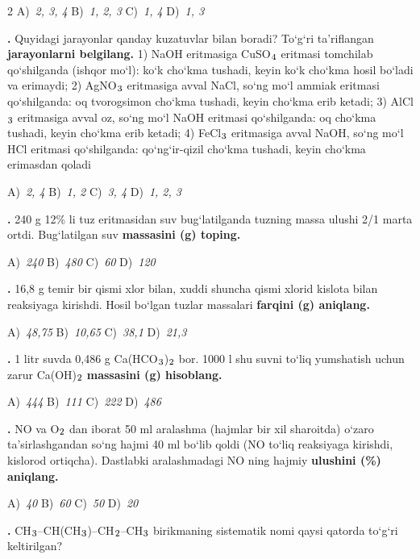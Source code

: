 \documentclass[11pt,a4paper]{article}
\renewcommand{\textsubscript}[1]{\ensuremath{_{\text{\fontsize{8}{8}\selectfont #1}}}}
\newcommand{\qn}[1]{\textbf{\fontsize{11.5}{13}\selectfont #1}}
\newcommand{\qsep}{\par\vspace{13pt}}
\begin{document}
\begin{multicols}{2}
\noindent A)~\textsl{2, 3, 4} \hfill B)~\textsl{1, 2, 3} \hfill C)~\textsl{1, 4} \hfill D)~\textsl{1, 3}\par
\qsep
\noindent\qn{15.} Quyidagi jarayonlar qanday kuzatuvlar bilan boradi? To`g`ri ta'riflangan \textbf{jarayonlarni belgilang.} 1) NaOH eritmasiga CuSO\textsubscript{4} eritmasi tomchilab qo`shilganda (ishqor mo`l): ko`k cho`kma tushadi, keyin ko`k cho`kma hosil bo`ladi va erimaydi; 2) AgNO\textsubscript{3} eritmasiga avval NaCl, so`ng mo`l ammiak eritmasi qo`shilganda: oq tvorogsimon cho`kma tushadi, keyin cho`kma erib ketadi; 3) AlCl\textsubscript{3} eritmasiga avval oz, so`ng mo`l NaOH eritmasi qo`shilganda: oq cho`kma tushadi, keyin cho`kma erib ketadi; 4) FeCl\textsubscript{3} eritmasiga avval NaOH, so`ng mo`l HCl eritmasi qo`shilganda: qo`ng`ir-qizil cho`kma tushadi, keyin cho`kma erimasdan qoladi

\noindent A)~\textsl{2, 4} \hfill B)~\textsl{1, 2} \hfill C)~\textsl{3, 4} \hfill D)~\textsl{1, 2, 3}\par
\qsep
\noindent\qn{16.} 240 g 12\% li tuz eritmasidan suv bug`latilganda tuzning massa ulushi 2/1 marta ortdi. Bug`latilgan suv \textbf{massasini (g) toping.}

\noindent A)~\textsl{240} \hfill B)~\textsl{480} \hfill C)~\textsl{60} \hfill D)~\textsl{120}\par
\qsep
\noindent\qn{17.} 16,8 g temir bir qismi xlor bilan, xuddi shuncha qismi xlorid kislota bilan reaksiyaga kirishdi. Hosil bo`lgan tuzlar massalari \textbf{farqini (g) aniqlang.}

\noindent A)~\textsl{48,75} \hfill B)~\textsl{10,65} \hfill C)~\textsl{38,1} \hfill D)~\textsl{21,3}\par
\qsep
\noindent\qn{18.} 1 litr suvda 0,486 g Ca(HCO\textsubscript{3})\textsubscript{2} bor. 1000 l shu suvni to`liq yumshatish uchun zarur Ca(OH)\textsubscript{2} \textbf{massasini (g) hisoblang.}

\noindent A)~\textsl{444} \hfill B)~\textsl{111} \hfill C)~\textsl{222} \hfill D)~\textsl{486}\par
\qsep
\noindent\qn{19.} NO va O\textsubscript{2} dan iborat 50 ml aralashma (hajmlar bir xil sharoitda) o`zaro ta'sirlashgandan so`ng hajmi 40 ml bo`lib qoldi (NO to`liq reaksiyaga kirishdi, kislorod ortiqcha). Dastlabki aralashmadagi NO ning hajmiy \textbf{ulushini (\%) aniqlang.}

\noindent A)~\textsl{40} \hfill B)~\textsl{60} \hfill C)~\textsl{50} \hfill D)~\textsl{20}\par
\qsep
\noindent\qn{20.} CH\textsubscript{3}--CH(CH\textsubscript{3})--CH\textsubscript{2}--CH\textsubscript{3} birikmaning sistematik nomi qaysi qatorda to`g`ri keltirilgan?


\end{multicols}
\end{document}
